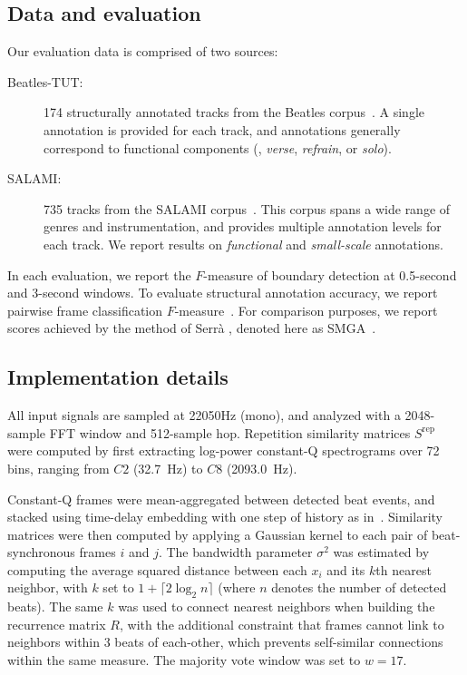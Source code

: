 \documentclass{article}
\begin{document}
\subsection{Data and evaluation}
Our evaluation data is comprised of two sources:
\begin{description}
\item[Beatles-TUT:]
174 structurally annotated tracks from the Beatles corpus~\cite{paulus2006music}.  A single
annotation is provided for each track, and annotations generally correspond to
functional components (\eg, \emph{verse}, \emph{refrain}, or \emph{solo}).
\item[SALAMI:] 735 tracks from the SALAMI corpus~\cite{smith2011design}.  This corpus
spans a wide range of genres and instrumentation, and provides multiple
annotation levels for each track.  We report results on \emph{functional} 
and \emph{small-scale} annotations.
\end{description}

In each evaluation, we report the $F$-measure of boundary detection at 0.5-second and
3-second windows.  To evaluate structural annotation accuracy, we report pairwise frame 
classification $F$-measure~\cite{levy2008structural}.  
For comparison purposes, we report scores achieved by the method of 
Serr\`{a} \etal, denoted here as SMGA~\cite{serra2014unsupervised}.

\subsection{Implementation details}
All input signals are sampled at 22050Hz (mono), and analyzed with a 2048-sample FFT window
and 512-sample hop.  Repetition similarity matrices $S^\text{rep}$ were 
computed by first extracting log-power constant-Q spectrograms over 72 bins, ranging 
from $C2$ (32.7~Hz) to $C8$ (2093.0~Hz).

Constant-Q frames were mean-aggregated between detected beat events, and stacked using 
time-delay embedding with one step of history as in~\cite{serra2014unsupervised}.
Similarity matrices were then computed by applying a Gaussian kernel
to each pair of beat-synchronous frames $i$ and $j$.
The bandwidth parameter $\sigma^2$ was estimated by computing the average 
squared distance between each $x_i$ and its $k$th nearest neighbor, with 
$k$ set to $1 + \lceil 2\log_2 n\rceil$ (where $n$ denotes the number of detected beats).
The same $k$ was used to connect nearest neighbors when building the recurrence matrix $R$, 
with the additional constraint that frames cannot link to neighbors within 3 beats of each-other, which prevents
self-similar connections within the same measure. The majority vote window was set to
$w=17$.
\end{document}
